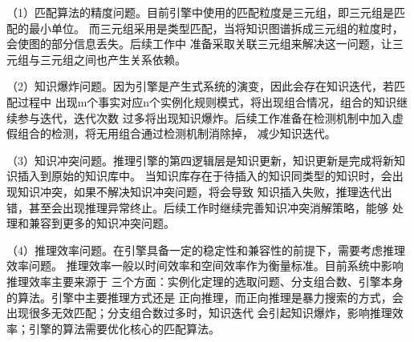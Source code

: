 \documentclass{standalone}
\begin{document}
（1）匹配算法的精度问题。目前引擎中使用的匹配粒度是三元组，即三元组是匹配的最小单位。
而三元组采用是类型匹配，当将知识图谱拆成三元组的粒度时，会使图的部分信息丢失。后续工作中
准备采取关联三元组来解决这一问题，让三元组与三元组之间也产生关系依赖。

（2）知识爆炸问题。因为引擎是产生式系统的演变，因此会存在知识迭代，若匹配过程中
出现m个事实对应n个实例化规则模式，将出现组合情况，组合的知识继续参与迭代，迭代次数
过多将出现知识爆炸。后续工作准备在检测机制中加入虚假组合的检测，将无用组合通过检测机制消除掉，
减少知识迭代。

（3）知识冲突问题。推理引擎的第四逻辑层是知识更新，知识更新是完成将新知识插入到原始的知识库中。
当知识库存在于待插入的知识同类型的知识时，会出现知识冲突，如果不解决知识冲突问题，将会导致
知识插入失败，推理迭代出错，甚至会出现推理异常终止。后续工作时继续完善知识冲突消解策略，能够
处理和兼容到更多的知识冲突问题。

（4）推理效率问题。在引擎具备一定的稳定性和兼容性的前提下，需要考虑推理效率问题。
推理效率一般以时间效率和空间效率作为衡量标准。目前系统中影响推理效率主要来源于
三个方面：实例化定理的选取问题、分支组合数、引擎本身的算法。引擎中主要推理方式还是
正向推理，而正向推理是暴力搜索的方式，会出现很多无效匹配；分支组合数过多时，知识迭代
会引起知识爆炸，影响推理效率；引擎的算法需要优化核心的匹配算法。
\end{document}
